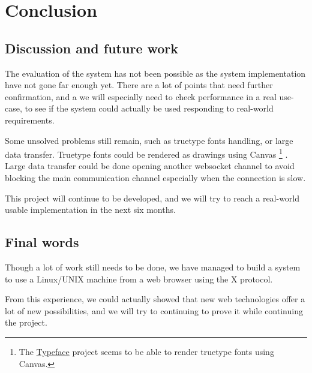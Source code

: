 \chapter{Conclusion}
\section{Discussion and future work}
The evaluation of the system has not been possible as the system implementation have not gone far enough yet.
There are a lot of points that need further confirmation, and a we will
especially need to check performance in a real use-case, to see 
if the system could actually be used responding to real-world requirements.

Some unsolved problems still remain, such as truetype fonts handling, 
or large data transfer. Truetype fonts could be rendered as drawings using 
Canvas
\footnote{The \href{http://typeface.neocracy.org/}{Typeface} project seems to be able to render truetype fonts using Canvas.}
. Large data transfer could be done opening another websocket channel 
to avoid blocking the main communication channel especially when the 
connection is slow.

This project will continue to be developed, and we will try to reach 
a real-world usable implementation in the next six months.
\section{Final words}
Though a lot of work still needs to be done, we have managed to 
build a system to use a Linux/UNIX machine from a web browser 
using the X protocol. 

From this experience, we could actually showed that new web technologies 
offer a lot of new possibilities, and we will try to continuing to prove it 
while continuing the project.